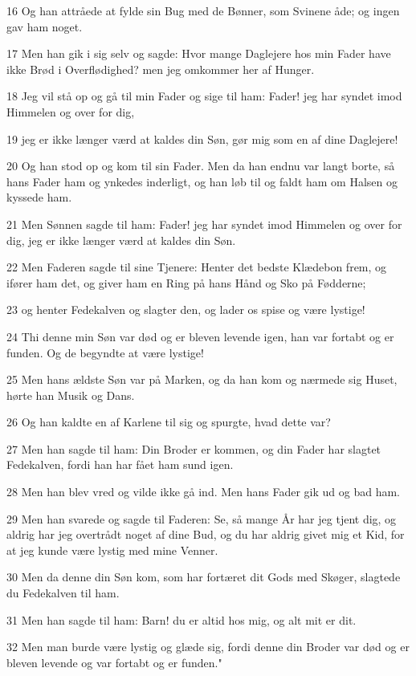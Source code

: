 \par 16 Og han attråede at fylde sin Bug med de Bønner, som Svinene åde; og ingen gav ham noget.
\par 17 Men han gik i sig selv og sagde: Hvor mange Daglejere hos min Fader have ikke Brød i Overflødighed? men jeg omkommer her af Hunger.
\par 18 Jeg vil stå op og gå til min Fader og sige til ham: Fader! jeg har syndet imod Himmelen og over for dig,
\par 19 jeg er ikke længer værd at kaldes din Søn, gør mig som en af dine Daglejere!
\par 20 Og han stod op og kom til sin Fader. Men da han endnu var langt borte, så hans Fader ham og ynkedes inderligt, og han løb til og faldt ham om Halsen og kyssede ham.
\par 21 Men Sønnen sagde til ham: Fader! jeg har syndet imod Himmelen og over for dig, jeg er ikke længer værd at kaldes din Søn.
\par 22 Men Faderen sagde til sine Tjenere: Henter det bedste Klædebon frem, og ifører ham det, og giver ham en Ring på hans Hånd og Sko på Fødderne;
\par 23 og henter Fedekalven og slagter den, og lader os spise og være lystige!
\par 24 Thi denne min Søn var død og er bleven levende igen, han var fortabt og er funden. Og de begyndte at være lystige!
\par 25 Men hans ældste Søn var på Marken, og da han kom og nærmede sig Huset, hørte han Musik og Dans.
\par 26 Og han kaldte en af Karlene til sig og spurgte, hvad dette var?
\par 27 Men han sagde til ham: Din Broder er kommen, og din Fader har slagtet Fedekalven, fordi han har fået ham sund igen.
\par 28 Men han blev vred og vilde ikke gå ind. Men hans Fader gik ud og bad ham.
\par 29 Men han svarede og sagde til Faderen: Se, så mange År har jeg tjent dig, og aldrig har jeg overtrådt noget af dine Bud, og du har aldrig givet mig et Kid, for at jeg kunde være lystig med mine Venner.
\par 30 Men da denne din Søn kom, som har fortæret dit Gods med Skøger, slagtede du Fedekalven til ham.
\par 31 Men han sagde til ham: Barn! du er altid hos mig, og alt mit er dit.
\par 32 Men man burde være lystig og glæde sig, fordi denne din Broder var død og er bleven levende og var fortabt og er funden."

